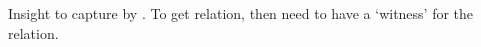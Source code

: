 \begin{note}
  Insight to capture by \issueInclusion{}.
  To get relation, then need to have a `witness' for the relation.
\end{note}

\newpage






